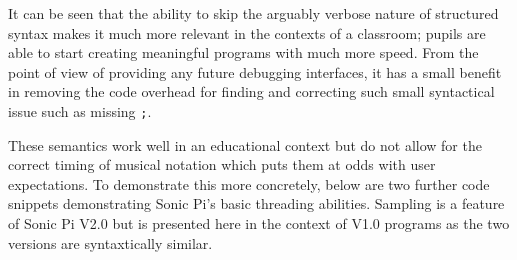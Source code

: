 \documentclass[11pt]{scrartcl}
\begin{document}
It can be seen that the ability to skip the arguably verbose nature of 
structured syntax makes it much more relevant in the contexts of a classroom; 
pupils are able to start creating meaningful programs with much more speed. From 
the point of view of providing any future debugging interfaces, it has a small 
benefit in removing the code overhead for finding and correcting such small 
syntactical issue such as missing \texttt{;}. 

These semantics work well in an educational context but do not allow for the 
correct timing of musical notation which puts them at odds with user 
expectations. To demonstrate this more concretely, below are two further code 
snippets demonstrating Sonic Pi's basic threading abilities. Sampling is a 
feature of Sonic Pi V2.0 but is presented here in the context of V1.0 
programs as the two versions are syntaxtically similar.
\end{document}
